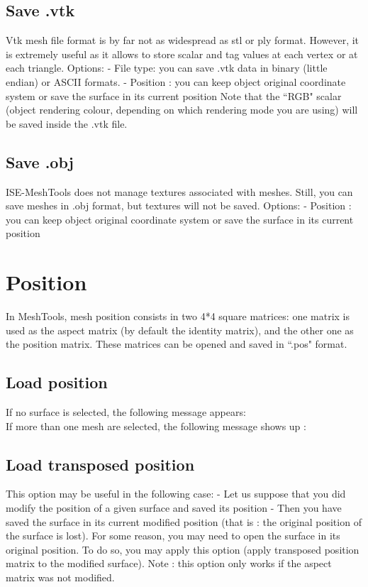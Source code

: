 \subsection{Save .vtk}
Vtk mesh file format is by far not as widespread as stl or ply
format. However, it is extremely useful as it allows to store
scalar and tag values at each vertex or at each triangle.
Options:
- File type: you can save .vtk data in binary (little endian) or
ASCII formats.
- Position : you can keep object original coordinate system
or save the surface in its current position
Note that the ``RGB" scalar (object rendering colour, depending on which rendering mode you are
using) will be saved inside the .vtk file.

\subsection{Save .obj}
ISE-MeshTools does not manage textures associated with
meshes. Still, you can save meshes in .obj format, but
textures will not be saved.
Options:
- Position : you can keep object original coordinate system
or save the surface in its current position

\section{Position}
In MeshTools, mesh position consists in two
4*4 square matrices: one matrix is used as the
aspect matrix (by default the identity matrix),
and the other one as the position matrix. These
matrices can be opened and saved in ``.pos"
format.

\subsection{Load position}
If no surface is selected, the following message
appears:\\
If more than one mesh are selected, the following message shows up :

\subsection{Load transposed position}
This option may be useful in the following case:
- Let us suppose that you did modify the position of a given surface and saved its position
- Then you have saved the surface in its current modified position (that is : the original position of the
surface is lost).
For some reason, you may need to open the surface in its original position. To do so, you may apply
this option (apply transposed position matrix to the modified surface).
Note : this option only works if the aspect matrix was not modified.

